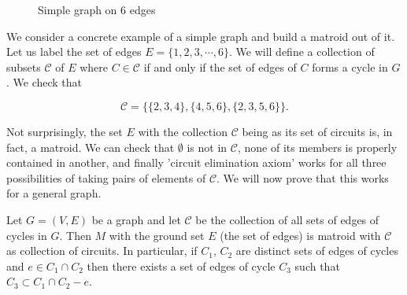 \begin{figure}[H]
\centering

\caption{Simple graph on 6 edges}
  \label{simp}

\end{figure}

We consider a concrete example of a simple graph and build a matroid out of it. Let us label the set of edges $E = \{1, 2, 3, \cdots, 6\}$. We will define a collection of subsets $\mathcal{C}$ of $E$ where $C \in \mathcal{C}$ if and only if the set of edges of $C$ forms a cycle in $G$. We check that 

    $$\mathcal{C} = \{\{2,3,4\}, \{4,5,6\}, \{2, 3, 5, 6\}\}.$$

Not surprisingly, the set $E$ with the collection $\mathcal{C}$ being as its set of circuits is, in fact, a matroid. We can check that $\emptyset$ is not in $\mathcal{C}$, none of its members is properly contained in another, and finally 'circuit elimination axiom' works for all three possibilities of taking pairs of elements of $\mathcal{C}$. We will now prove that this works for a general graph.

\begin{theorem}
Let $G = (V, E)$ be a graph and let $\mathcal{C}$ be the collection of all sets of edges of cycles in $G$. Then $M$ with the ground set $E$ (the set of edges) is matroid with $\mathcal{C}$ as collection of circuits. In particular, if $C_1$, $C_2$ are distinct sets of edges of cycles  and $e \in C_1 \cap C_2 $ then there exists a set of edges of cycle $C_3$ such that $C_3 \subset C_1 \cap C_2 -e$.
\end{theorem}


